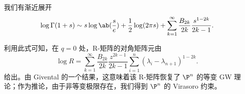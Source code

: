 \begin{lem}
    我们有渐近展开
    \[ \log \Gamma(1+s) \sim s \log \ab(\frac{s}{e}) + \frac{1}{2} \log(2\pi s) + \sum_{k=1}^{\infty} \frac{B_{2k}}{2k} \frac{s^{1-2k}}{2k-1}. \]
\end{lem}
利用此式可知，在 \(q = 0\) 处，R-矩阵的对角矩阵元由
\[ \log R = \sum_{k=1}^{\infty} \frac{B_{2k}}{2k} \frac{z^{2k-1}}{2k-1} \sum_{i =1}^n (\lambda_i - \lambda_{n+1})^{1-2k}. \]
给出。由 Givental 的一个结果，这意味着该 R-矩阵恢复了 \(\P^n\) 的等变 GW 理论；作为推论，由于非等变极限存在，我们得到 \(\P^n\) 的 Virasoro 约束。

